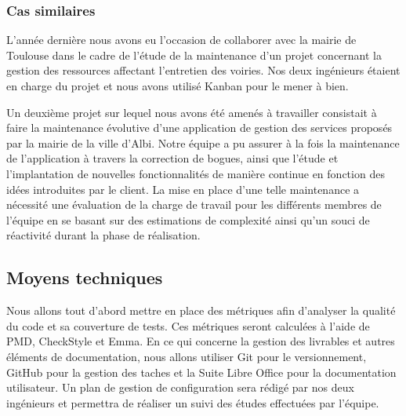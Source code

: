 		\subsubsection{Cas similaires}
		L’année dernière nous avons eu l’occasion de collaborer avec la mairie de Toulouse dans le cadre de l’étude de la maintenance d’un projet concernant la gestion des ressources affectant l’entretien des voiries. Nos deux ingénieurs étaient en charge du projet et nous avons utilisé Kanban pour le mener à bien.
		
		Un deuxième projet sur lequel nous avons été amenés à travailler consistait à faire la maintenance évolutive d’une application de gestion des services proposés par la mairie de la ville d’Albi. Notre équipe a pu assurer à la fois la maintenance de l’application à travers la correction de bogues, ainsi que l’étude et l'implantation de nouvelles fonctionnalités de manière continue en fonction des idées introduites par le client. La mise en place d’une telle maintenance a nécessité une évaluation de la charge de travail pour les différents membres de l’équipe en se basant sur des estimations de complexité ainsi qu’un souci de réactivité durant la phase de réalisation.
		
	\subsection{Moyens techniques}
	Nous allons tout d’abord mettre en place des métriques afin d’analyser la qualité du code et sa couverture de tests. Ces métriques seront calculées à l’aide de PMD, CheckStyle et Emma. 
	En ce qui concerne la gestion des livrables et autres éléments de documentation, nous allons utiliser Git pour le versionnement, GitHub pour la gestion des taches et la Suite Libre Office pour la documentation utilisateur. Un plan de gestion de configuration sera rédigé par nos deux ingénieurs et permettra de réaliser un suivi des études effectuées par l’équipe. 
	